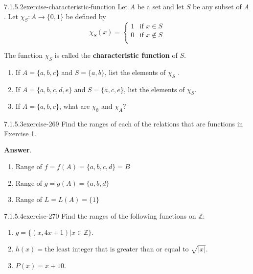 \documentclass[twoside,10pt,]{book}
\newcommand{\terminology}[1]{\textbf{#1}}
\numberwithin{equation}{section}
\begin{document}
\begin{divisionsolution}{7.1.5.2}{}{exercise-characteristic-function}%
\hypertarget{p-2285}{}%
Let \(A\) be a set and let \(S\) be any subset of \(A\). Let \(\chi_S: A\to \{0,1\}\) be defined by%
\begin{equation*}
\chi_S(x)= \left\{
\begin{array}{cc}
1 & \textrm{if } x\in S \\
0 & \textrm{if } x\notin S \\
\end{array}
\right.
\end{equation*}
%
\par
\hypertarget{p-2286}{}%
The function \(\chi_S\) is called the \terminology{characteristic function} of \(S\).%
\par
\hypertarget{p-2287}{}%
\leavevmode%
\begin{enumerate}[label=(\alph*)]
\item\hypertarget{li-1186}{}\hypertarget{p-2288}{}%
If \(A = \{a, b, c\}\) and \(S = \{a, b\}\), list the elements of \(\chi_S\) .%
\item\hypertarget{li-1187}{}\hypertarget{p-2289}{}%
If \(A = \{a, b, c, d, e\}\) and \(S = \{a, c, e\}\), list the elements of \(\chi_S\).%
\item\hypertarget{li-1188}{}\hypertarget{p-2290}{}%
If \(A = \{a, b, c\}\), what are \(\chi_{\emptyset}\) and \(\chi_A\)?%
\end{enumerate}
%
\end{divisionsolution}%
\begin{divisionsolution}{7.1.5.3}{}{exercise-269}%
\hypertarget{p-2291}{}%
Find the ranges of each of the relations that are functions in Exercise 1.%
\par\smallskip%
\noindent\textbf{Answer}.\quad%
\hypertarget{p-2292}{}%
\leavevmode%
\begin{enumerate}[label=(\alph*)]
\item\hypertarget{li-1189}{}\hypertarget{p-2293}{}%
Range of \(f=f(A)=\{a,b,c,d\}=B\)%
\item\hypertarget{li-1190}{}\hypertarget{p-2294}{}%
Range of \(g=g(A)=\{a,b,d\}\)%
\item\hypertarget{li-1191}{}\hypertarget{p-2295}{}%
Range of \(L=L(A)=\{1\}\)%
\end{enumerate}
%
\end{divisionsolution}%
\begin{divisionsolution}{7.1.5.4}{}{exercise-270}%
\hypertarget{p-2296}{}%
Find the ranges of the following functions on \(\mathbb{Z}\):%
\par
\hypertarget{p-2297}{}%
\leavevmode%
\begin{enumerate}[label=(\alph*)]
\item\hypertarget{li-1192}{}\hypertarget{p-2298}{}%
\(g = \{(x, 4x +1)|x \in  \mathbb{Z}\}\).%
\item\hypertarget{li-1193}{}\hypertarget{p-2299}{}%
\(h(x) = \textrm{the least integer that is greater than or equal to } \sqrt{|x|}\).%
\item\hypertarget{li-1194}{}\hypertarget{p-2300}{}%
\(P(x) = x + 10\).%
\end{enumerate}
%
\end{divisionsolution}%
\end{document}

